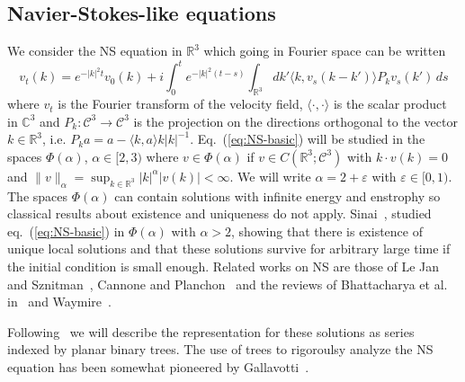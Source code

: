 \documentclass[a4paper]{article}
\newcommand{\1}{{\bf 1}}
\newcommand{\eps}{\varepsilon}
\newcommand{\RR}{\mathbb{R}}
\newcommand{\CC}{\mathcal{C}}
\newcommand{\CC}{\mathcal{C}}
\newcommand{\RR}{\mathbb{R}}
\newcommand{\eps}{\varepsilon}
\begin{document}
\subsection{Navier-Stokes-like equations}

We consider the NS equation in $\RR^3$ which going in Fourier space
can be written
\begin{equation}
  \label{eq:NS-basic}
v_t(k) = e^{-|k|^2 t} v_0(k) + i \int_0^t e^{-|k|^2 (t-s)} \int_{\RR^3}dk' \langle k, v_s(k-k')\rangle P_k v_s(k') \,ds
\end{equation}
where $v_t$ is the Fourier transform of
the velocity field, $\langle \cdot ,\cdot \rangle$ is the scalar
product in $\mathbb{C}^3$ and $P_k: \CC^3 \to \CC^3$ is the projection
on the directions orthogonal to the vector $k \in \RR^3$, i.e.
$
P_k a = a - \langle k,a\rangle k |k|^{-1}
$.
Eq.~(\ref{eq:NS-basic}) will be studied in the spaces
$\Phi(\alpha)$, $\alpha \in [2,3)$ where $v \in \Phi(\alpha)$ if $v \in C(\RR^3;\CC^3)$ with $k \cdot v(k) = 0$ and 
$\|v\|_\alpha = \sup_{k\in\RR^3} |k|^\alpha |v(k)| < \infty $.
We will write $\alpha = 2+\eps$ with $\eps \in [0,1)$.
The spaces $\Phi(\alpha)$ can contain solutions with infinite energy
and enstrophy so classical results about existence and uniqueness
do not apply.
 Sinai~\cite{Sinai1,Sinai2,Sinai3}, studied
eq.~(\ref{eq:NS-basic}) in $\Phi(\alpha)$ with $\alpha > 2$, showing
that there is existence of unique local
solutions and that these solutions survive for arbitrary large time if
the initial condition is small enough.
Related works on NS are those of Le Jan and Sznitman~\cite{LS},
Cannone and Planchon~\cite{CP} and  the reviews of Bhattacharya et
al. in~\cite{MR1997593} and Waymire~\cite{MR2121794}.

Following~\cite{MR2227041} we will describe the  representation for these solutions as
series indexed by planar binary trees. The use of trees to rigoroulsy analyze the
NS equation has been somewhat pioneered by Gallavotti~\cite{Gall}.
\end{document}
